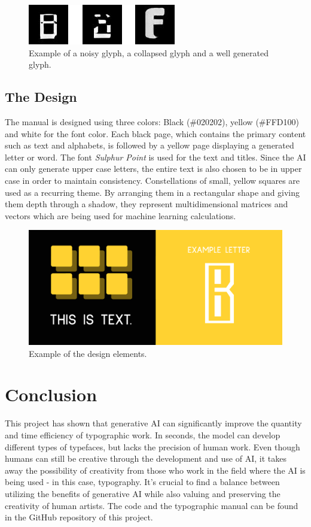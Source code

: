 \documentclass[11pt]{article}
\begin{document}
\begin{figure}
    \centering
    \includegraphics[width=0.45\columnwidth]{examples.png}
    \caption{Example of a noisy glyph, a collapsed glyph and a well generated glyph.}
    \label{fig:examples}
\end{figure}

\subsection{The Design}
The manual is designed using three colors: Black (\textcolor{blackColor}{\#020202}), yellow (\textcolor{yellowColor}{\#FFD100}) and white for the font color. Each black page, which contains the primary content such as text and alphabets, is followed by a yellow page displaying a generated letter or word. The font \emph{Sulphur Point} is used for the text and titles. Since the AI can only generate upper case letters, the entire text is also chosen to be in upper case in order to maintain consistency.
Constellations of small, yellow squares are used as a recurring theme. By arranging them in a rectangular shape and giving them depth through a shadow, they represent multidimensional matrices and vectors which are being used for machine learning calculations.

\begin{figure}[hbt!]
    \centering
    \includegraphics[width=0.65\columnwidth]{design.png}
    \caption{Example of the design elements.}
    \label{fig:design}
\end{figure}
\FloatBarrier

\section{Conclusion}
This project has shown that generative AI can significantly improve the quantity and time efficiency of typographic work. In seconds, the model can develop different types of typefaces, but lacks the precision of human work. Even though humans can still be creative through the development and use of AI, it takes away the possibility of creativity from those who work in the field where the AI is being used - in this case, typography. It's crucial to find a balance between utilizing the benefits of generative AI while also valuing and preserving the creativity of human artists.
The code and the typographic manual can be found in the GitHub repository \cite{fontGenerationGan} of this project.
\end{document}
